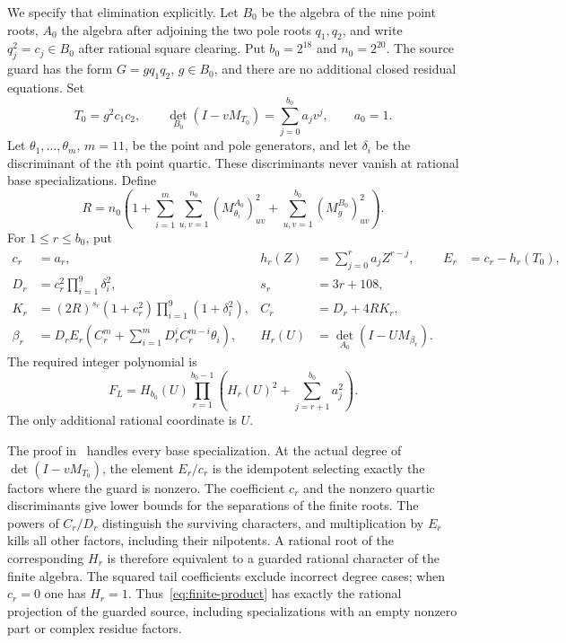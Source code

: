 \documentclass[11pt,a4paper]{article}
\begin{document}
We specify that elimination explicitly. Let $B_0$ be the algebra of
the nine point roots, $A_0$ the algebra after adjoining the two pole
roots $q_1,q_2$, and write $q_j^2=c_j\in B_0$ after rational
square clearing. Put $b_0=2^{18}$ and $n_0=2^{20}$. The source
guard has the form $G=gq_1q_2$, $g\in B_0$, and there are no
additional closed residual equations. Set
\[
 T_0=g^2c_1c_2,\qquad
 \det_{B_0}(I-vM_{T_0})=\sum_{j=0}^{b_0}a_jv^j,\qquad a_0=1.
\]
Let $\theta_1,\ldots,\theta_m$, $m=11$, be the point and pole
generators, and let $\delta_i$ be the discriminant of the $i$th
point quartic. These discriminants never vanish at rational base
specializations. Define
\[
 R=n_0\left(1+\sum_{i=1}^{m}\sum_{u,v=1}^{n_0}
              (M_{\theta_i}^{A_0})_{uv}^2
            +\sum_{u,v=1}^{b_0}(M_g^{B_0})_{uv}^2\right).
\]
For $1\le r\le b_0$, put
\begin{align*}
 c_r&=a_r,&h_r(Z)&=\sum_{j=0}^r a_jZ^{r-j},&E_r&=c_r-h_r(T_0),\\
 D_r&=c_r^2\prod_{i=1}^9\delta_i^2,&s_r&=3r+108,\\
 K_r&=(2R)^{s_r}(1+c_r^2)\prod_{i=1}^9(1+\delta_i^2),&
 C_r&=D_r+4RK_r,\\
 \beta_r&=D_rE_r\left(C_r^m+
             \sum_{i=1}^mD_r^iC_r^{m-i}\theta_i\right),&
 H_r(U)&=\det_{A_0}(I-UM_{\beta_r}).
\end{align*}
The required integer polynomial is
\begin{equation}\label{eq:finite-product}
 F_L=H_{b_0}(U)\prod_{r=1}^{b_0-1}
            \left(H_r(U)^2+\sum_{j=r+1}^{b_0}a_j^2\right).
\end{equation}
The only additional rational coordinate is $U$.

The proof in~\cite{Active} handles every base specialization.
At the actual degree of $\det(I-vM_{T_0})$, the element $E_r/c_r$
is the idempotent selecting exactly the factors where the guard is
nonzero. The coefficient $c_r$ and the nonzero quartic discriminants
give lower bounds for the separations of the finite roots. The
powers of $C_r/D_r$ distinguish the surviving characters, and
multiplication by $E_r$ kills all other factors, including their
nilpotents. A rational root of the corresponding $H_r$ is therefore
equivalent to a guarded rational character of the finite algebra.
The squared tail coefficients exclude incorrect degree cases; when
$c_r=0$ one has $H_r=1$. Thus~\eqref{eq:finite-product} has
exactly the rational projection of the guarded source, including
specializations with an empty nonzero part or complex residue factors.
\end{document}
